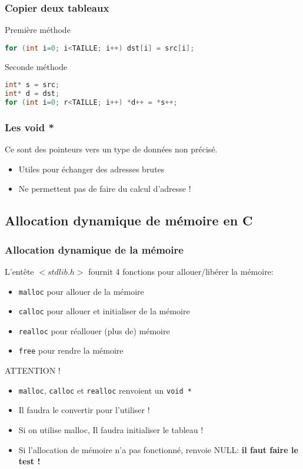 \documentclass{beamer}
\begin{document}
\begin{frame}[fragile=singleslide,shrink=20]
\frametitle{Copier deux tableaux}
\begin{block}{Première méthode}
\begin{lstlisting}[language=c++]
for (int i=0; i<TAILLE; i++) dst[i] = src[i];
\end{lstlisting}
\end{block}
\begin{block}{Seconde méthode}
\begin{lstlisting}[language=c++]
int* s = src;
int* d = dst;
for (int i=0; r<TAILLE; i++) *d++ = *s++;
\end{lstlisting}
\end{block}

\end{frame}

\begin{frame}[fragile=singleslide,shrink=20]
\frametitle{Les void *}
Ce sont des pointeurs vers un type de données non précisé.
\begin{itemize}
\item{Utiles pour échanger des adresses brutes}
\item{Ne permettent pas de faire du calcul d'adresse !}
\end{itemize}
\end{frame}

\subsection{Allocation dynamique de mémoire en C}

\begin{frame}[fragile=singleslide,shrink=20]
\frametitle{Allocation dynamique de la mémoire}
L'entête $<stdlib.h>$ fournit 4 fonctions pour allouer/libérer la mémoire:
\begin{itemize}
\item{\texttt{malloc} pour allouer de la mémoire}
\item{\texttt{calloc} pour allouer et initialiser de la mémoire}
\item{\texttt{realloc} pour réallouer (plus de) mémoire}
\item{\texttt{free} pour rendre la mémoire}
\end{itemize}

\begin{block}{ATTENTION !}
\begin{itemize}
\item{\texttt{malloc}, \texttt{calloc} et \texttt{realloc} renvoient un \texttt{void *}}
\item{Il faudra le convertir pour l'utiliser !}
\item{Si on utilise malloc, Il faudra initialiser le tableau !}
\item{Si l'allocation de mémoire n'a pas fonctionné, renvoie NULL: \textbf{il faut faire le test !}}
\end{itemize}
\end{block}
\end{frame}
\end{document}
